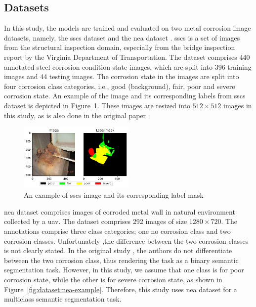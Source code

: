 \documentclass[mathematics,article,submit,pdftex,moreauthors]{Definitions/mdpi}
\begin{document}
\subsection{Datasets}
In this study, the models are trained and evaluated on two metal corrosion image
datasets, namely, the \ac{sscs} dataset \cite{Bianchi2021Dataset,Bianchi2022Journal} and 
the \ac{nea} dataset \cite{Liu2023}. \ac{sscs} is a set of 
images from the structural inspection domain,
especially from the bridge inspection report 
by the Virginia Department of Transportation. 
The dataset comprises 440 annotated steel corrosion condition state images,
which are split into 396 training images and 44 testing images.
The corrosion state in the images are split into four corrosion
class categories, i.e., good (background), fair, poor and severe corrosion state.
An example of the image and its corresponding labels
from \ac{sscs} dataset is depicted in Figure~\ref{fig:dataset:ccsc-example}.
These images are resized into $512\times 512$ images in this study, as is also done
in the original paper \cite{Bianchi2022Journal}.

\begin{figure}[htbp]
    \begin{center}
    \includegraphics[width=0.5\textwidth]{figures/ccsc-example.pdf}
    \caption{An example of \ac{sscs} image and its corresponding label mask}
    \label{fig:dataset:ccsc-example}
    \end{center}
\end{figure}

\ac{nea} dataset comprises images of corroded metal wall
in natural environment collected by a \ac{uav}.
The dataset comprises 292 images of size $1280\times 720$.
The annotations comprise three class categories; one no corrosion class
and two corrosion classes. Unfortunately ,the difference
between the two corrosion classes is not clearly stated. 
In the original study \cite{Liu2023}, the authors
do not differentiate between the two corrosion class,
thus rendering the task as a binary semantic segmentation
task. However, in this study, 
we assume that one class is for poor corrosion state, 
while the other is for severe corrosion state, as shown
in Figure~\ref{fig:dataset:nea-example}. Therefore,
this study uses \ac{nea} dataset for a multiclass semantic
segmentation task.
\end{document}
